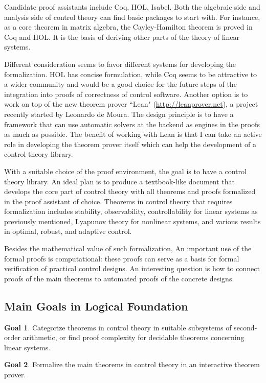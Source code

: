 \documentclass[11pt]{article}
\theoremstyle{definition}
\newtheorem{goal}{Goal}
\begin{document}
Candidate proof assistants include Coq, HOL, Isabel. Both the algebraic side and analysis side of control theory can find basic packages to start with. For instance, as a core theorem in matrix algebra, the Cayley-Hamilton theorem is proved in Coq and HOL. It is the basis of deriving other parts of the theory of linear systems. 

Different consideration seems to favor different systems for developing the formalization. HOL has concise formulation, while Coq seems to be attractive to a wider community and would be a good choice for the future steps of the integration into proofs of correctness of control software. Another option is to work on top of the new theorem prover ``Lean" (\url{http://leanprover.net}), a project recently started by Leonardo de Moura. The design principle is to have a framework that can use automatic solvers at the backend as engines in the proofs as much as possible. The benefit of working with Lean is that I can take an active role in developing the theorem prover itself which can help the development of a control theory library. 

With a suitable choice of the proof environment, the goal is to have a control theory library. An ideal plan is to produce a textbook-like document that develops the core part of control theory with all theorems and proofs formalized in the proof assistant of choice. Theorems in control theory that requires formalization includes stability, observability, controllability for linear systems as previously mentioned, Lyapunov theory for nonlinear systems, and various results in optimal, robust, and adaptive control. 

Besides the mathematical value of such formalization, An important use of the formal proofs is computational: these proofs can serve as a basis for formal verification of practical control designs. An interesting question is how to connect proofs of the main theorems to automated proofs of the concrete designs. 

\subsection{Main Goals in Logical Foundation}
\begin{goal}
Categorize theorems in control theory in suitable subsystems of second-order arithmetic, or find proof complexity for decidable theorems concerning linear systems. 
\end{goal}
\begin{goal}
Formalize the main theorems in control theory in an interactive theorem prover.  
\end{goal}
\end{document}
